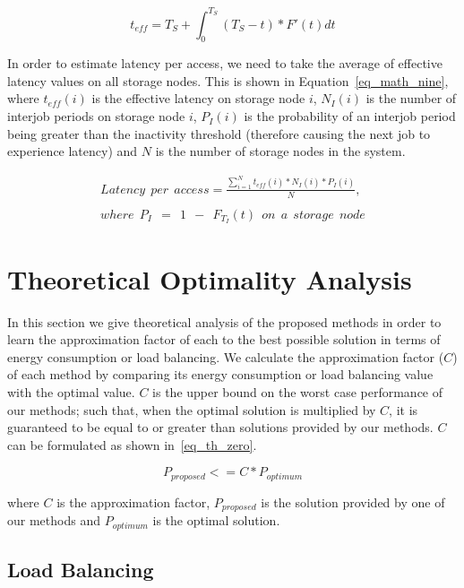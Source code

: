 \documentclass[preprint,12pt]{elsarticle}
\begin{document}
\begin{equation}
\label{eq_math_eight}
t_{eff} = T_S + \int_{0}^{T_S} (T_S -
t) * F'(t) dt
\end{equation}
\hfill
 
In order to estimate latency per access, we need to take the average of
effective latency values on all storage nodes. This is shown in
Equation~\eqref{eq_math_nine}, where $t_{eff}(i)$
is the effective latency on storage node $i$, $N_I(i)$ is the number
of interjob periods on storage node $i$, $P_I(i)$ is the probability of an interjob period
being greater than the inactivity threshold (therefore causing the next job to
experience latency) and $N$ is the number of storage nodes in the system.

\begin{equation}
\begin{gathered}
Latency\ \ per\ \ access = \frac{\sum\limits_{i=1}^N t_{eff}(i) * N_I(i) * P_I(i)}{N},
\\
\\
where\ \ P_I\ \ =\ \ 1\ \ -\ \ F_{T_I}(t)\ \ on\ \ a\ \ storage\ \ node
\end{gathered}
\label{eq_math_nine}
\end{equation}
\hfill

\section{Theoretical Optimality Analysis}
\label{theory}
In this section we give theoretical analysis of the proposed methods in order to learn
the approximation factor of each to the best possible solution in terms of energy consumption
or load balancing. We calculate the approximation factor ($C$) of each method by comparing its
energy consumption or load balancing value with the optimal value. $C$ is the upper bound on the
worst case performance of our methods; such that, when the optimal solution is multiplied
by $C$, it is guaranteed to be equal to or greater than solutions provided by our methods.
$C$ can be formulated as shown in~\eqref{eq_th_zero}.

\begin{equation}
P_{proposed} <= C * P_{optimum}
\label{eq_th_zero}
\end{equation}
\hfill

where $C$ is the approximation factor, $P_{proposed}$ is the solution provided by one of our
methods and $P_{optimum}$ is the optimal solution.

\subsection{Load Balancing}
\end{document}
